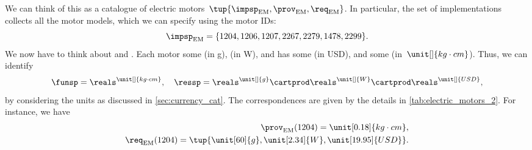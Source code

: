 \begin{example}
	We can think of this as a catalogue of electric motors~$\tup{\impsp_\mathrm{EM},\prov_\mathrm{EM},\req_\mathrm{EM}}$.
	In particular, the set of implementations collects all the motor models, which we can specify using the motor IDs:
	\begin{equation}
		\impsp_\mathrm{EM}=\{1204,1206,1207,2267,2279,1478,2299 \}.
	\end{equation}
	We now have to think about  and .
	Each motor  some  (in \unit[]{g}),  (in \unit[]{W}), and has some  (in USD), and  some  (in~$\unit[]{kg\cdot cm}$).
	Thus, we can identify
	\begin{equation*}
		\funsp =\reals^{\unit[]{kg\cdot cm}},\quad \ressp=\reals^{\unit[]{g}}\cartprod \reals^{\unit[]{W}}\cartprod \reals^{\unit[]{USD}},
	\end{equation*}
	by considering the units as discussed in \cref{sec:currency_cat}.
	The correspondences are given by the details in \cref{tab:electric_motors_2}.
	For instance, we have
	\begin{align}
		\prov_\mathrm{EM}(1204)=\unit[0.18]{kg\cdot cm}, \\ \req_\mathrm{EM}(1204)=\tup{\unit[60]{g},\unit[2.34]{W},\unit[19.95]{USD}}.
	\end{align}


\end{example}
